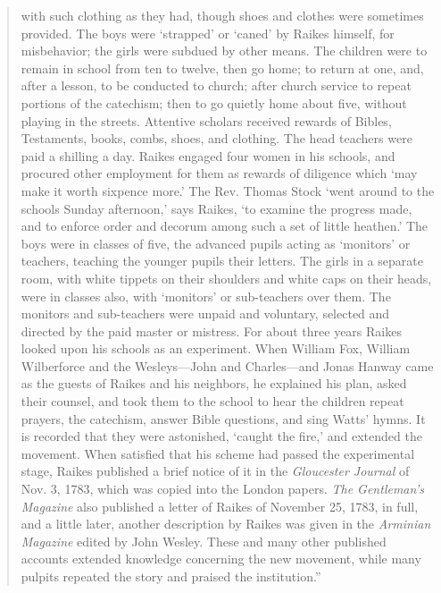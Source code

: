\begin{quote}
with such clothing as they had, though shoes and clothes were sometimes provided. The boys were ‘strapped’ or ‘caned’ by Raikes himself, for misbehavior; the girls were subdued by other means. The children were to remain in school from ten to twelve, then go home; to return at one, and, after a lesson, to be conducted to church; after church service to repeat portions of the catechism; then to go quietly home about five, without playing in the streets. Attentive scholars received rewards of Bibles, Testaments, books, combs, shoes, and clothing. The head teachers were paid a shilling a day. Raikes engaged four women in his schools, and procured other employment for them as rewards of diligence which ‘may make it worth sixpence more.’ The Rev. Thomas Stock ‘went around to the schools Sunday afternoon,’ says Raikes, ‘to examine the progress made, and to enforce order and decorum among such a set of little heathen.’ The boys were in classes of five, the advanced pupils acting as ‘monitors’ or teachers, teaching the younger pupils their letters. The girls in a separate room, with white tippets on their shoulders and white caps on their heads, were in classes also, with ‘monitors’ or sub-teachers over them. The monitors and sub-teachers were unpaid and voluntary, selected and directed by the paid master or mistress. For about three years Raikes looked upon his schools as an experiment. When William Fox, William Wilberforce and the Wesleys—John and Charles—and Jonas Hanway came as the guests of Raikes and his neighbors, he explained his plan, asked their counsel, and took them to the school to hear the children repeat prayers, the catechism, answer Bible questions, and sing Watts’ hymns. It is recorded that they were astonished, ‘caught the fire,’ and extended the movement. When satisfied that his scheme had passed the experimental stage, Raikes published a brief notice of it in the \emph{Gloucester Journal} of Nov. 3, 1783, which was copied into the London papers. \emph{The Gentleman’s Magazine} also published a letter of Raikes of November 25, 1783, in full, and a little later, another description by Raikes was given in the \emph{Arminian Magazine} edited by John Wesley. These and many other published accounts extended knowledge concerning the new movement, while many pulpits repeated the story and praised the institution.”
\end{quote}


